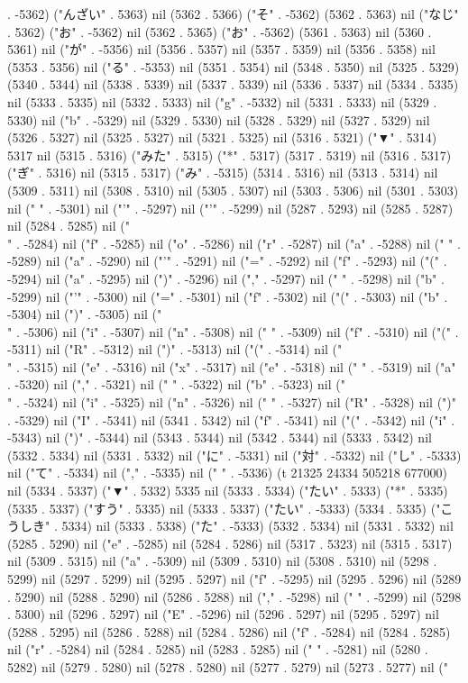 . -5362) ("んざい" . 5363) nil (5362 . 5366) ("そ" . -5362) (5362 . 5363) nil ("なじ" . 5362) ("お" . -5362) nil (5362 . 5365) ("お" . -5362) (5361 . 5363) nil (5360 . 5361) nil ("が" . -5356) nil (5356 . 5357) nil (5357 . 5359) nil (5356 . 5358) nil (5353 . 5356) nil ("る" . -5353) nil (5351 . 5354) nil (5348 . 5350) nil (5325 . 5329) (5340 . 5344) nil (5338 . 5339) nil (5337 . 5339) nil (5336 . 5337) nil (5334 . 5335) nil (5333 . 5335) nil (5332 . 5333) nil ("g" . -5332) nil (5331 . 5333) nil (5329 . 5330) nil ("b" . -5329) nil (5329 . 5330) nil (5328 . 5329) nil (5327 . 5329) nil (5326 . 5327) nil (5325 . 5327) nil (5321 . 5325) nil (5316 . 5321) ("▼" . 5314) 5317 nil (5315 . 5316) ("みた" . 5315) ("*" . 5317) (5317 . 5319) nil (5316 . 5317) ("ぎ" . 5316) nil (5315 . 5317) ("み" . -5315) (5314 . 5316) nil (5313 . 5314) nil (5309 . 5311) nil (5308 . 5310) nil (5305 . 5307) nil (5303 . 5306) nil (5301 . 5303) nil (" " . -5301) nil ("'" . -5297) nil ("'" . -5299) nil (5287 . 5293) nil (5285 . 5287) nil (5284 . 5285) nil ("\\" . -5284) nil ("f" . -5285) nil ("o" . -5286) nil ("r" . -5287) nil ("a" . -5288) nil (" " . -5289) nil ("a" . -5290) nil ("'" . -5291) nil ("=" . -5292) nil ("f" . -5293) nil ("(" . -5294) nil ("a" . -5295) nil (")" . -5296) nil ("," . -5297) nil (" " . -5298) nil ("b" . -5299) nil ("'" . -5300) nil ("=" . -5301) nil ("f" . -5302) nil ("(" . -5303) nil ("b" . -5304) nil (")" . -5305) nil ("\\" . -5306) nil ("i" . -5307) nil ("n" . -5308) nil (" " . -5309) nil ("f" . -5310) nil ("(" . -5311) nil ("R" . -5312) nil (")" . -5313) nil ("(" . -5314) nil ("\\" . -5315) nil ("e" . -5316) nil ("x" . -5317) nil ("e" . -5318) nil (" " . -5319) nil ("a" . -5320) nil ("," . -5321) nil (" " . -5322) nil ("b" . -5323) nil ("\\" . -5324) nil ("i" . -5325) nil ("n" . -5326) nil (" " . -5327) nil ("R" . -5328) nil (")" . -5329) nil ("I" . -5341) nil (5341 . 5342) nil ("f" . -5341) nil ("(" . -5342) nil ("i" . -5343) nil (")" . -5344) nil (5343 . 5344) nil (5342 . 5344) nil (5333 . 5342) nil (5332 . 5334) nil (5331 . 5332) nil ("に" . -5331) nil ("対" . -5332) nil ("し" . -5333) nil ("て" . -5334) nil ("," . -5335) nil (" " . -5336) (t 21325 24334 505218 677000) nil (5334 . 5337) ("▼" . 5332) 5335 nil (5333 . 5334) ("たい" . 5333) ("*" . 5335) (5335 . 5337) ("すう" . 5335) nil (5333 . 5337) ("たい" . -5333) (5334 . 5335) ("こうしき" . 5334) nil (5333 . 5338) ("た" . -5333) (5332 . 5334) nil (5331 . 5332) nil (5285 . 5290) nil ("e" . -5285) nil (5284 . 5286) nil (5317 . 5323) nil (5315 . 5317) nil (5309 . 5315) nil ("a" . -5309) nil (5309 . 5310) nil (5308 . 5310) nil (5298 . 5299) nil (5297 . 5299) nil (5295 . 5297) nil ("f" . -5295) nil (5295 . 5296) nil (5289 . 5290) nil (5288 . 5290) nil (5286 . 5288) nil ("," . -5298) nil (" " . -5299) nil (5298 . 5300) nil (5296 . 5297) nil ("E" . -5296) nil (5296 . 5297) nil (5295 . 5297) nil (5288 . 5295) nil (5286 . 5288) nil (5284 . 5286) nil ("f" . -5284) nil (5284 . 5285) nil ("r" . -5284) nil (5284 . 5285) nil (5283 . 5285) nil (" " . -5281) nil (5280 . 5282) nil (5279 . 5280) nil (5278 . 5280) nil (5277 . 5279) nil (5273 . 5277) nil (" 